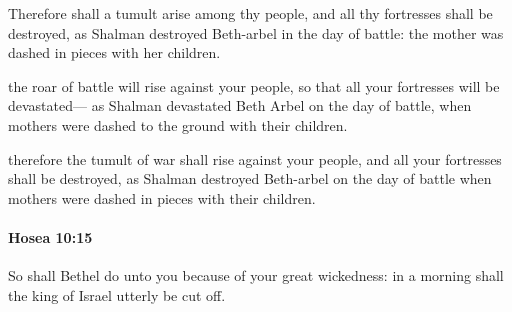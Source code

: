 			\begin{versebox}
					\item[BHS] 
					\item[LXX] 
					\item[ASV] Therefore shall a tumult arise among thy people, and all thy fortresses shall be destroyed, as Shalman destroyed Beth-arbel in the day of battle: the mother was dashed in pieces with her children.
					\item[NIV] the roar of battle will rise against your people, so that all your fortresses will be devastated— as Shalman devastated Beth Arbel on the day of battle, when mothers were dashed to the ground with their children.
					\item[NRSV] therefore the tumult of war shall rise against your people, and all your fortresses shall be destroyed, as Shalman destroyed Beth-arbel on the day of battle when mothers were dashed in pieces with their children.
			\end{versebox}

		\paragraph{Hosea 10:15} %
			\label{HOSEA-10-15}

			So shall Bethel do unto you because of your great wickedness: in a morning shall the king of Israel utterly be cut off.

